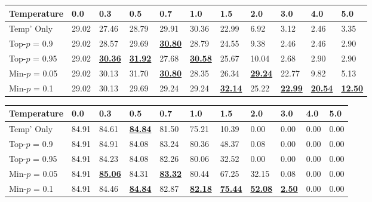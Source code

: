 \documentclass{article}
\begin{document}
\begin{table*}[ht]
\vspace{0.5em}
\begin{subtable}[t]{\textwidth}
\centering
\caption{Accuracy (\%) on GPQA Main benchmark (LLAMA 3.1 8B-Instruct)}
\vspace{-0.5em}
\begin{tabular}{lllllllllll}
\toprule
Temperature & 0.0 & 0.3 & 0.5 & 0.7 & 1.0 & 1.5 & 2.0 & 3.0 & 4.0 & 5.0 \\
\midrule
Temp' Only & 29.02 & 27.46 & 28.79 & 29.91 & 30.36 & 22.99 & 6.92 & 3.12 & 2.46 & 3.35 \\
Top-\(p\) = 0.9 & 29.02 & 28.57 & 29.69 & \textbf{\underline{30.80}} & 28.79 & 24.55 & 9.38 & 2.46 & 2.46 & 2.90 \\
Top-\(p\) = 0.95 & 29.02 & \textbf{\underline{30.36}} & \textbf{\underline{31.92}} & 27.68 & \textbf{\underline{30.58}} & 25.67 & 10.04 & 2.68 & 2.90 & 2.90 \\
Min-\(p\) = 0.05 & 29.02 & 30.13 & 31.70 & \textbf{\underline{30.80}} & 28.35 & 26.34 & \textbf{\underline{29.24}} & 22.77 & 9.82 & 5.13 \\
Min-\(p\) = 0.1 & 29.02 & 30.13 & 29.69 & 29.24 & 29.24 & \textbf{\underline{32.14}} & 25.22 & \textbf{\underline{22.99}} & \textbf{\underline{20.54}} & \textbf{\underline{12.50}} \\
\bottomrule
\end{tabular}
\end{subtable}

\vspace{0.5em}
\begin{subtable}[t]{\textwidth}
\centering
\caption{Accuracy (\%) on GSM8K CoT benchmark (LLAMA 3.1 8B-Instruct)}
\vspace{-0.5em}
\begin{tabular}{lllllllllll}
\toprule
Temperature & 0.0 & 0.3 & 0.5 & 0.7 & 1.0 & 1.5 & 2.0 & 3.0 & 4.0 & 5.0 \\
\midrule
Temp' Only & 84.91 & 84.61 & \textbf{\underline{84.84}} & 81.50 & 75.21 & 10.39 & 0.00 & 0.00 & 0.00 & 0.00 \\
Top-\(p\) = 0.9 & 84.91 & 84.91 & 84.08 & 83.24 & 80.36 & 48.37 & 0.08 & 0.00 & 0.00 & 0.00 \\
Top-\(p\) = 0.95 & 84.91 & 84.23 & 84.08 & 82.26 & 80.06 & 32.52 & 0.00 & 0.00 & 0.00 & 0.00 \\
Min-\(p\) = 0.05 & 84.91 & \textbf{\underline{85.06}} & 84.31 & \textbf{\underline{83.32}} & 80.44 & 67.25 & 32.15 & 0.08 & 0.00 & 0.00 \\
Min-\(p\) = 0.1 & 84.91 & 84.46 & \textbf{\underline{84.84}} & 82.87 & \textbf{\underline{82.18}} & \textbf{\underline{75.44}} & \textbf{\underline{52.08}} & \textbf{\underline{2.50}} & 0.00 & 0.00 \\
\bottomrule

\end{tabular}
\end{subtable}

\end{table*}
\end{document}
